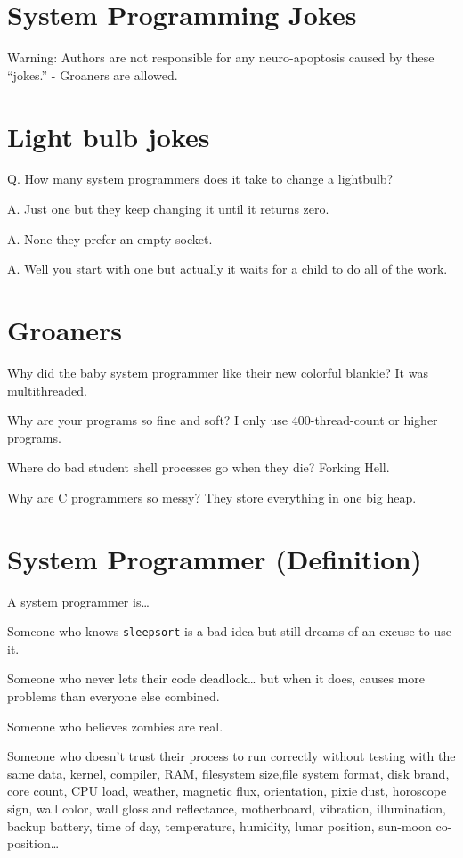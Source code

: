 \section{System Programming Jokes}\label{system-programming-jokes}

Warning: Authors are not responsible for any neuro-apoptosis caused by
these ``jokes.'' - Groaners are allowed.

\section{Light bulb jokes}\label{light-bulb-jokes}

Q. How many system programmers does it take to change a lightbulb?

A. Just one but they keep changing it until it returns zero.

A. None they prefer an empty socket.

A. Well you start with one but actually it waits for a child to do all
of the work.

\section{Groaners}\label{groaners}

Why did the baby system programmer like their new colorful blankie? It
was multithreaded.

Why are your programs so fine and soft? I only use 400-thread-count or
higher programs.

Where do bad student shell processes go when they die? Forking Hell.

Why are C programmers so messy? They store everything in one big heap.

\section{System Programmer
(Definition)}\label{system-programmer-definition}

A system programmer is\ldots{}

Someone who knows \texttt{sleepsort} is a bad idea but still dreams of
an excuse to use it.

Someone who never lets their code deadlock\ldots{} but when it does,
causes more problems than everyone else combined.

Someone who believes zombies are real.

Someone who doesn't trust their process to run correctly without testing
with the same data, kernel, compiler, RAM, filesystem size,file system
format, disk brand, core count, CPU load, weather, magnetic flux,
orientation, pixie dust, horoscope sign, wall color, wall gloss and
reflectance, motherboard, vibration, illumination, backup battery, time
of day, temperature, humidity, lunar position, sun-moon
co-position\ldots{}

